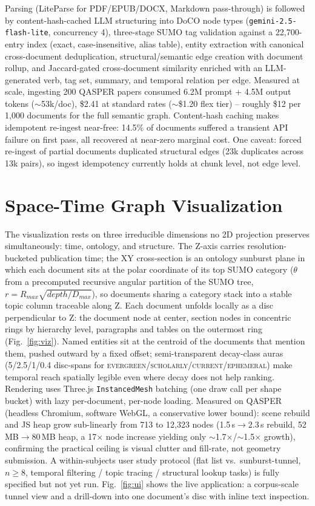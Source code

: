\documentclass[conference,a4paper]{IEEEtran}
\begin{document}
Parsing (LiteParse for PDF/EPUB/DOCX, Markdown pass-through) is followed by content-hash-cached LLM structuring into DoCO node types (\texttt{gemini-2.5-flash-lite}, concurrency 4), three-stage SUMO tag validation against a 22{,}700-entry index (exact, case-insensitive, alias table), entity extraction with canonical cross-document deduplication, structural/semantic edge creation with document rollup, and Jaccard-gated cross-document similarity enriched with an LLM-generated verb, tag set, summary, and temporal relation per edge. Measured at scale, ingesting 200 QASPER papers consumed 6.2M prompt + 4.5M output tokens ($\sim$53k/doc), \$2.41 at standard rates ($\sim$\$1.20 flex tier) -- roughly \$12 per 1{,}000 documents for the full semantic graph. Content-hash caching makes idempotent re-ingest near-free: 14.5\% of documents suffered a transient API failure on first pass, all recovered at near-zero marginal cost. One caveat: forced re-ingest of partial documents duplicated structural edges (23k duplicates across 13k pairs), so ingest idempotency currently holds at chunk level, not edge level.

\section{Space-Time Graph Visualization}

The visualization rests on three irreducible dimensions no 2D projection preserves simultaneously: time, ontology, and structure. The Z-axis carries resolution-bucketed publication time; the XY cross-section is an ontology sunburst plane in which each document sits at the polar coordinate of its top SUMO category ($\theta$ from a precomputed recursive angular partition of the SUMO tree, $r = R_{max}\sqrt{depth/D_{max}}$), so documents sharing a category stack into a stable topic column traceable along Z. Each document unfolds locally as a disc perpendicular to Z: the document node at center, section nodes in concentric rings by hierarchy level, paragraphs and tables on the outermost ring (Fig.~\ref{fig:viz}). Named entities sit at the centroid of the documents that mention them, pushed outward by a fixed offset; semi-transparent decay-class auras (5/2.5/1/0.4 disc-spans for \textsc{evergreen}/\textsc{scholarly}/\textsc{current}/\textsc{ephemeral}) make temporal reach spatially legible even where decay does not help ranking. Rendering uses Three.js \texttt{InstancedMesh} batching (one draw call per shape bucket) with lazy per-document, per-node loading. Measured on QASPER (headless Chromium, software WebGL, a conservative lower bound): scene rebuild and JS heap grow sub-linearly from 713 to 12{,}323 nodes (1.5\,s$\to$2.3\,s rebuild, 52\,MB$\to$80\,MB heap, a 17$\times$ node increase yielding only $\sim$1.7$\times$/$\sim$1.5$\times$ growth), confirming the practical ceiling is visual clutter and fill-rate, not geometry submission. A within-subjects user study protocol (flat list vs.\ sunburst-tunnel, $n\geq8$, temporal filtering / topic tracing / structural lookup tasks) is fully specified but not yet run. Fig.~\ref{fig:ui} shows the live application: a corpus-scale tunnel view and a drill-down into one document's disc with inline text inspection.
\end{document}
